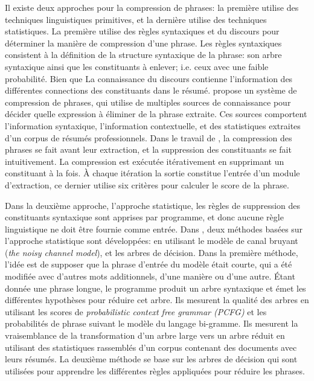 \documentclass[a4paper,12pt,oneside]{../use/ESIthesis}
\begin{document}
Il existe deux approches pour la compression de phrases: la première utilise des techniques linguistiques primitives, et la dernière utilise des techniques statistiques. 
La première utilise des règles syntaxiques et du discours pour déterminer la manière de compression d'une phrase. 
Les règles syntaxiques consistent à la définition de la structure syntaxique de la phrase: son arbre syntaxique ainsi que les constituants à enlever; i.e. ceux avec une faible probabilité.
Bien que La connaissance du discours contienne l'information des différentes connections des constituants dans le résumé. 
%
\cite{00-jing} propose un système de compression de phrases, qui utilise de multiples sources de connaissance pour décider quelle expression à éliminer de la phrase extraite. 
Ces sources comportent l'information syntaxique, l'information contextuelle, et des statistiques extraites d'un corpus de résumés professionnels. 
%
Dans le travail de \cite{07-Zajic-al}, la compression des phrases se fait avant leur extraction, et la suppression des constituants se fait intuitivement. 
La compression est exécutée itérativement en supprimant un constituant à la fois. 
À chaque itération la sortie constitue l'entrée d'un module d'extraction, ce dernier utilise six critères pour calculer le score de la phrase.

Dans la deuxième approche, l'approche statistique, les règles de suppression des constituants syntaxique sont apprises par programme, et donc aucune règle linguistique ne doit être fournie comme entrée. 
%
Dans \cite{02-knight-marcu}, deux méthodes basées sur l'approche statistique sont développées: en utilisant le modèle de canal bruyant (\textit{the noisy channel model}), et les arbres de décision. 
Dans la première méthode, l'idée est de supposer que la phrase d'entrée du modèle était courte, qui a été modifiée avec d'autres mots additionnels, d'une manière ou d'une autre.
Étant donnée une phrase longue, le programme produit un arbre syntaxique et émet les différentes hypothèses pour réduire cet arbre. 
Ils mesurent la qualité des arbres en utilisant les scores de \textit{probabilistic context free grammar (PCFG) } et les probabilités de phrase suivant le modèle du langage bi-gramme. 
Ils mesurent la vraisemblance de la transformation d'un arbre large vers un arbre réduit en utilisant des statistiques rassemblés d'un corpus contenant des documents avec leurs résumés. 
La deuxième méthode se base sur les arbres de décision qui sont utilisées pour apprendre les différentes règles appliquées pour réduire les phrases.
%
\end{document}
